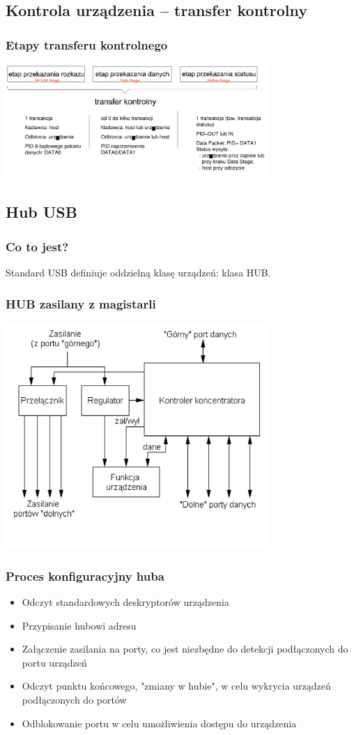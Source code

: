 \documentclass[a4paper,twoside]{article}
\begin{document}
\subsection{Kontrola urządzenia – transfer kontrolny}
	\subsubsection{Etapy transferu kontrolnego}
	\includegraphics[width=10cm]{./wyklady/USB_31_1.pdf}
	
\subsection{Hub USB}
	\subsubsection{Co to jest?}
	Standard USB definiuje oddzielną klasę urządzeń: klasa HUB.
	\subsubsection{HUB zasilany z magistarli}
	\includegraphics[width=10cm]{./wyklady/USB_34_1.pdf}
	\subsubsection{Proces konfiguracyjny huba}
	\begin{itemize}
		\item Odczyt standardowych deskryptorów urządzenia
		\item Przypisanie hubowi adresu
		\item Załączenie zasilania na porty, co jest niezbędne do detekcji podłączonych do portu urządzeń
		\item Odczyt punktu końcowego, "zmiany w hubie", w celu wykrycia urządzeń podłączonych do portów
		\item Odblokowanie portu w celu umożliwienia dostępu do urządzenia
	\end{itemize}
\end{document}
